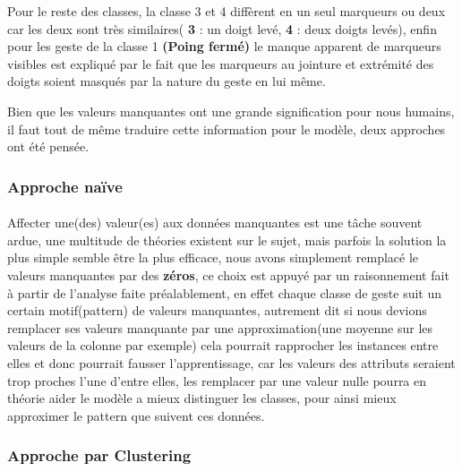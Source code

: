 Pour le reste des classes, la classe 3 et 4 diffèrent en un seul marqueurs ou deux car les deux sont très similaires( \textbf{3} : un doigt levé, \textbf{4} : deux doigts levés), enfin pour les geste de la classe 1 \textbf{(Poing fermé)} le manque apparent de marqueurs visibles est expliqué par le fait que les marqueurs au jointure et extrémité des doigts soient masqués par la nature du geste en lui même.\par 
Bien que les valeurs manquantes ont une grande signification pour nous humains, il faut tout de même traduire cette information pour le modèle, deux approches ont été pensée.
\subsubsection{Approche naïve}\label{naiveApproache}
\paragraph{}
Affecter une(des) valeur(es) aux données manquantes est une tâche souvent ardue, une multitude de théories existent sur le sujet, mais parfois la solution la plus simple semble être la plus efficace, nous avons simplement remplacé le valeurs manquantes par des \textbf{zéros}, ce choix est appuyé par un raisonnement fait à partir de l'analyse faite préalablement, en effet chaque classe de geste suit un certain motif(pattern) de valeurs manquantes, autrement dit si nous devions remplacer ses valeurs manquante par une approximation(une moyenne sur les valeurs de la colonne par exemple) cela pourrait rapprocher les instances entre elles et donc pourrait fausser l'apprentissage, car les valeurs des attributs seraient trop proches l'une d'entre elles, les remplacer par une valeur nulle pourra en théorie aider le modèle a mieux distinguer les classes, pour ainsi mieux approximer le pattern que suivent ces données.	
\subsubsection{Approche par Clustering}\label{clusterApproache}
\paragraph{}